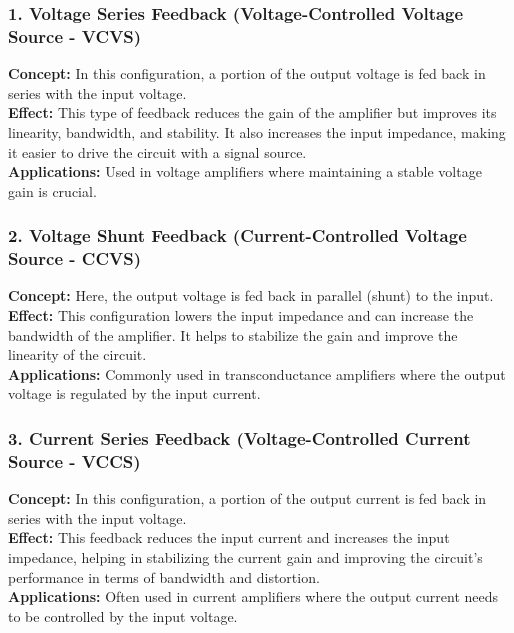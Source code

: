 \documentclass[a4paper,12pt]{report}
\begin{document}
  \subsubsection*{1. Voltage Series Feedback (Voltage-Controlled Voltage Source - VCVS)}
    \textbf{Concept:} In this configuration, a portion of the output voltage is fed back in series with the input voltage.\\
    \newline
    \textbf{Effect:} This type of feedback reduces the gain of the amplifier but improves its linearity, bandwidth, and stability. It also increases the input impedance, making it easier to drive the circuit with a signal source.\\
    \newline
    \textbf{Applications:} Used in voltage amplifiers where maintaining a stable voltage gain is crucial.\\

  \subsubsection*{2. Voltage Shunt Feedback (Current-Controlled Voltage Source - CCVS)}
    \textbf{Concept:} Here, the output voltage is fed back in parallel (shunt) to the input.\\
    \newline
    \textbf{Effect:} This configuration lowers the input impedance and can increase the bandwidth of the amplifier. It helps to stabilize the gain and improve the linearity of the circuit.\\
    \newline
    \textbf{Applications:} Commonly used in transconductance amplifiers where the output voltage is regulated by the input current.\\

  \subsubsection*{3. Current Series Feedback (Voltage-Controlled Current Source - VCCS)}
    \textbf{Concept:} In this configuration, a portion of the output current is fed back in series with the input voltage.\\
    \newline
    \textbf{Effect:} This feedback reduces the input current and increases the input impedance, helping in stabilizing the current gain and improving the circuit's performance in terms of bandwidth and distortion.\\
    \newline
    \textbf{Applications:} Often used in current amplifiers where the output current needs to be controlled by the input voltage.\\
\end{document}
